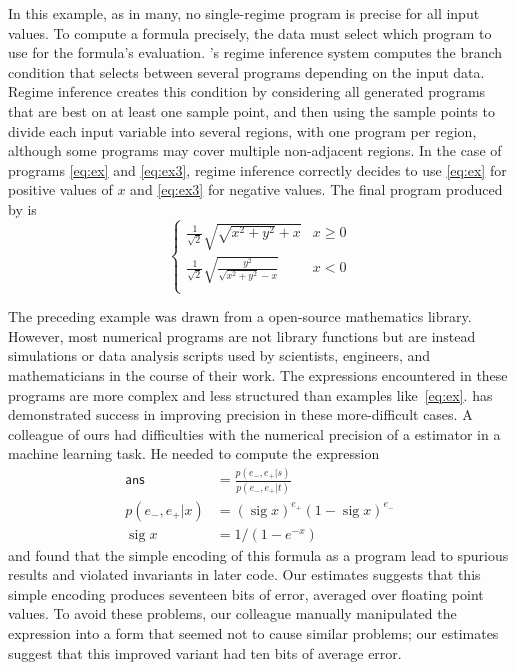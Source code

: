 \documentclass[paper.tex]{subfiles}
\begin{document}
In this example, as in many,
  no single-regime program is precise for all input values.
To compute a formula precisely, the data must select
  which program to use for the formula's evaluation.
\casio's regime inference system
  computes the branch condition
  that selects between several programs depending on the input data.
Regime inference creates this condition
  by considering all generated programs
  that are best on at least one sample point,
  and then using the sample points to divide each input variable
  into several regions, with one program per region,
  although some programs may cover multiple non-adjacent regions.
In the case of programs \eqref{eq:ex} and \eqref{eq:ex3},
  regime inference correctly decides
  to use \eqref{eq:ex} for positive values of $x$
  and \eqref{eq:ex3} for negative values.
The final program produced by \casio is
\[
\begin{cases}
  \frac1{\sqrt2} \sqrt{\sqrt{x^2 + y^2} + x} & x \ge 0 \\
  \frac1{\sqrt2} \sqrt{\frac{y^2}{\sqrt{x^2 + y^2} - x}} & x < 0 \\
\end{cases}
\]

The preceding example was drawn from a open-source mathematics library.
However, most numerical programs are not library functions
  but are instead simulations or data analysis scripts
  used by scientists, engineers, and mathematicians
  in the course of their work.
The expressions encountered in these programs are more complex
  and less structured than examples like~\eqref{eq:ex}.
\casio has demonstrated success in improving precision
  in these more-difficult cases.
A colleague of ours had difficulties with the numerical precision
  of a estimator in a machine learning task.
He needed to compute the expression
\begin{align*}
\mathsf{ans} &= \frac{p(e_-,e_+|s)}{p(e_-,e_+|t)} \\
p(e_-, e_+|x) &= (\operatorname{sig} x)^{e_+} (1 - \operatorname{sig} x)^{e_-} \\
\operatorname{sig}x &= 1 / (1 - e^{-x})
\end{align*}
  and found that the simple encoding of this formula as a program
  lead to spurious results and violated invariants in later code.
Our estimates suggests that this simple encoding produces
  seventeen bits of error, averaged over floating point values.
To avoid these problems,
  our colleague manually manipulated the expression
  into a form that seemed not to cause similar problems;
  our estimates suggest that this improved variant
  had ten bits of average error.
\end{document}
